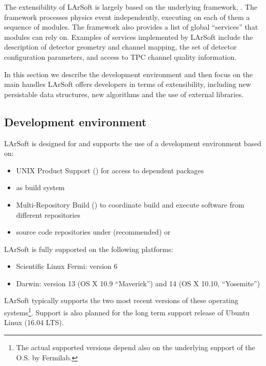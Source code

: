 
The extensibility of LArSoft is largely based on the underlying
framework, \ART. The \ART framework processes physics event
independently, executing on each of them a sequence of modules.
The framework also provides a list of global ``services'' that modules can rely on.
Examples of services implemented by LArSoft include
the description of detector geometry and channel mapping,
the set of detector configuration parameters,
and access to TPC channel quality information.

In this section we describe the development environment
and then focus on the main handles LArSoft offers developers in terms of extensibility,
including new persistable data structures, new algorithms
and the use of external libraries.


\subsection{Development environment}
\label{ssec:Development:Environment}

LArSoft is designed for and supports the use of a development environment based on:
\begin{itemize}
   \item UNIX Product Support (\UPS) for access to dependent packages
   \item \cetbuildtools\cite{cetbuildtools} as build system
   \item Multi-Repository Build\cite{MRB} (\MRB)  to coordinate build and execute software from different repositories
   \item source code repositories under \git (recommended) or \SVN
\end{itemize}

LArSoft is fully supported on the following platforms:
\begin{itemize}
   \item Scientific Linux Fermi: version 6
   \item Darwin: version 13 (OS X 10.9 ``Maverick'') and 14 (OS X 10.10, ``Yosemite'')
\end{itemize}
LArSoft typically supports the two most recent versions of these operating systems\footnote{
The actual supported versions depend also on the underlying support of the O.S. by Fermilab.
}.
Support is also planned for the long term support release of Ubuntu Linux (16.04 LTS).

